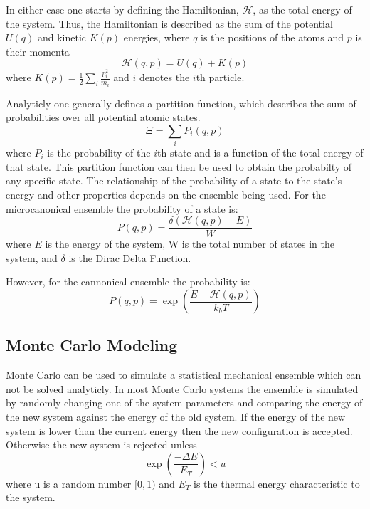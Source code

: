 In either case one starts by defining the Hamiltonian, $\mathcal{H}$, as the total energy of the system.
Thus, the Hamiltonian is described as the sum of the potential $U(q)$ and kinetic $K(p)$ energies, where $q$ is the positions of the atoms and $p$ is their momenta
\begin{equation} \label{Hamiltonian}
  \mathcal{H}(q, p) = U(q) + K(p)
\end{equation}
\noindent where $K(p) = \frac{1}{2}\sum_{i} \frac{p_{i}^{2}}{m_{i}}$ and $i$ denotes the $i$th particle.

Analyticly one generally defines a partition function, which describes the sum of probabilities over all potential atomic states.
\[
\Xi = \sum_{i} P_{i}(q, p)
\]
where $P_{i}$ is the probability of the $i$th state and is a function of the total energy of that state.
This partition function can then be used to obtain the probabilty of any specific state.
The relationship of the probability of a state to the state's energy and other properties depends on the ensemble being used.
For the microcanonical ensemble the probability of a state is:
\begin{equation}
P(q, p) = \frac{\delta(\mathcal{H}(q, p) - E)}{W}
\end{equation}
where $E$ is the energy of the system, W is the total number of states in the system, and $\delta$ is the Dirac Delta Function.

However, for the cannonical ensemble the probability is:
\begin{equation}
P(q, p) = \exp(\frac{E-\mathcal{H}(q, p)}{k_{b}T})
\end{equation}

\subsection{Monte Carlo Modeling}
Monte Carlo can be used to simulate a statistical mechanical ensemble which can not be solved analyticly.
In most Monte Carlo systems the ensemble is simulated by randomly changing one of the system parameters and comparing the energy of the new system against the energy of the old system.
If the energy of the new system is lower than the current energy then the new configuration is accepted.
Otherwise the new system is rejected unless
\[
\exp(\frac{-\Delta E}{E_{T}}) < u
\]
where u is a random number $[0, 1)$ and $E_{T}$ is the thermal energy characteristic to the system.


